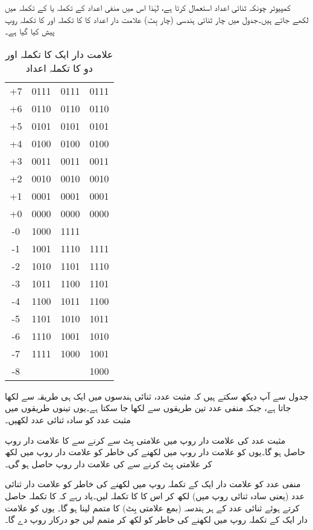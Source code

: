  کمپیوٹر چونکہ ثنائی اعداد استعمال کرتا ہے، لہٰذا اس میں منفی اعداد  کے تکملہ یا  کے تکملہ میں لکھے جاتے ہیں۔جدول  میں چار ثنائی ہندسی (چار بِٹ) علامت دار اعداد کا  کا تکملہ اور  کا تکملہ روپ پیش کیا گیا ہے۔
\begin{table}
\caption{علامت دار ایک کا تکملہ اور دو کا تکملہ اعداد}
\label{جدول_حساب_علامت_دار_تکملہ_ایک_دو}
\centering
\begin{tabular}{CCCC}
\toprule
{} &  &  & \\
\midrule
+7&0111&0111&0111\\
+6&0110&0110&0110\\
+5&0101&0101&0101\\
+4&0100&0100&0100\\[0.5em]
+3&0011&0011&0011\\
+2&0010&0010&0010\\
+1&0001&0001&0001\\
+0&0000&0000&0000\\[0.5em]
-0&1000&1111&\\
-1&1001&1110&1111\\
-2&1010&1101&1110\\
-3&1011&1100&1101\\[0.5em]
-4&1100&1011&1100\\
-5&1101&1010&1011\\
-6&1110&1001&1010\\
-7&1111&1000&1001\\
-8&&&1000\\
\bottomrule
\end{tabular}
\end{table}

جدول  سے آپ دیکھ سکتے ہیں کہ مثبت عدد، ثنائی ہندسوں میں ایک ہی طریقہ سے لکھا جاتا ہے، جبکہ منفی عدد تین طریقوں سے لکھا جا سکتا ہے۔یوں تینوں طریقوں میں مثبت عدد کو سادہ ثنائی عدد لکھیں۔

	مثبت عدد  کی علامت دار روپ میں علامتی بِٹ  سے  کرنے سے  کا علامت دار روپ حاصل ہو گا۔یوں  کو علامت دار روپ میں لکھنے کی خاطر  کو علامت دار روپ  میں لکھ کر علامتی بِٹ  کرنے سے  کی علامت دار روپ  حاصل ہو گی۔
	
منفی عدد  کو علامت دار ایک کے تکملہ روپ میں لکھنے کی خاطر  کو علامت دار ثنائی عدد (یعنی سادہ ثنائی روپ میں) لکھ کر اس کا  کا تکملہ لیں۔یاد رہے کہ  کا تکملہ حاصل کرتے ہوئے ثنائی عدد کے ہر ہندسہ (بمع علامتی بِٹ) کا متمم لینا ہو گا۔ یوں  کو علامت دار ایک کے تکملہ روپ میں لکھنے کی خاطر  کو  لکھ کر متمم لیں جو درکار روپ  دے گا۔

